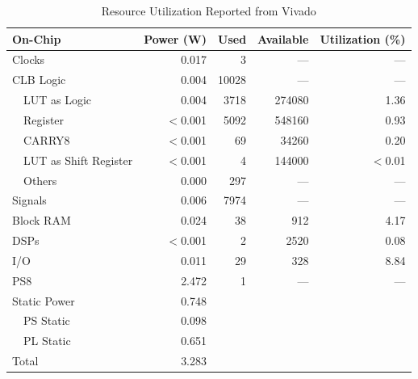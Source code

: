 \begin{table}
    \centering
    \begin{tabular}{|l|r|r|r|r|}
    \hline
    \textbf{On-Chip} & \textbf{Power (W)} & \textbf{Used} & \textbf{Available} & \textbf{Utilization (\%)} \\
    \hline
    Clocks & 0.017 & 3 & --- & --- \\
    CLB Logic & 0.004 & 10028 & --- & --- \\
    ~~LUT as Logic & 0.004 & 3718 & 274080 & 1.36 \\
    ~~Register & $<$0.001 & 5092 & 548160 & 0.93 \\
    ~~CARRY8 & $<$0.001 & 69 & 34260 & 0.20 \\
    ~~LUT as Shift Register & $<$0.001 & 4 & 144000 & $<$0.01 \\
    ~~Others & 0.000 & 297 & --- & --- \\
    Signals & 0.006 & 7974 & --- & --- \\
    Block RAM & 0.024 & 38 & 912 & 4.17 \\
    DSPs & $<$0.001 & 2 & 2520 & 0.08 \\
    I/O & 0.011 & 29 & 328 & 8.84 \\
    PS8 & 2.472 & 1 & --- & --- \\
    Static Power & 0.748 & & & \\
    ~~PS Static & 0.098 & & & \\
    ~~PL Static & 0.651 & & & \\
    Total & 3.283 & & & \\
    \hline
    \end{tabular}
    \caption{Resource Utilization Reported from Vivado}
    \label{table:util}
\end{table}